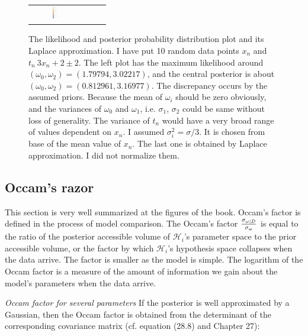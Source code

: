 \documentclass[a4paper,11pt]{article}
\numberwithin{equation}{section}
\begin{document}
{\begin{figure}
{\begin{tabular}{cccc}
\includegraphics[width=0.1\textwidth]{BayesianRegression3.png}
\end{tabular}}
\caption[The plot of exercise 27.3]{\label{BayesianRegression} \small The likelihood and posterior probability distribution plot and its Laplace approximation. I have put 10 random data points $x_n$ and $t_n ~ 3x_n+2 \pm 2$. The left plot has the maximum likelihood around $(\omega_0, \omega_2) = (1.79794, 3.02217)$, and the central posterior is about $(\omega_0, \omega_2) = (0.812961, 3.16977)$. The discrepancy occurs by the assumed priors. Because the mean of $\omega_i$ should be zero obviously, and the variances of $\omega_0$ and $\omega_1$, i.e. $\sigma_1$, $\sigma_2$ could be same without loss of generality. The variance of $t_n$ would have a very broad range of values dependent on $x_n$. I assumed $\sigma_i^2 = \sigma/3$. It is chosen from base of the mean value of $x_n$. The last one is obtained by Laplace approximation. I did not normalize them.}
\end{figure}


\subsection{Occam's razor}

This section is very well summarized at the figures of the book. Occam's factor is defined in the process of model comparison. The Occam's factor ${\sigma_{\omega|D}\over \sigma_{\omega}}$ is equal to the ratio of the posterior accessible volume of $\mathcal{H}_i$'s parameter space to the prior accessible volume, or the factor by which $\mathcal{H}_i$'s hypothesis space collapses when the data arrive. The factor is smaller as the model is simple. The logarithm of the Occam factor is a measure of the amount of
information we gain about the model's parameters when the data arrive.

{\it Occam factor for several parameters}
If the posterior is well approximated by a Gaussian, then the Occam factor
is obtained from the determinant of the corresponding covariance matrix (cf.
equation (28.8) and Chapter 27):

}
\end{document}
